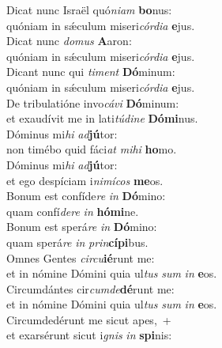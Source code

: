 \evenverse Dicat nunc Israël quó\textit{ni}\textit{am} \textbf{bo}nus:~\*\\
\evenverse quóniam in sǽculum miseri\textit{cór}\textit{di}\textit{a} \textbf{e}jus.\\
\oddverse Dicat nunc \textit{do}\textit{mus} \textbf{A}aron:~\*\\
\oddverse quóniam in sǽculum miseri\textit{cór}\textit{di}\textit{a} \textbf{e}jus.\\
\evenverse Dicant nunc qui \textit{ti}\textit{ment} \textbf{Dó}minum:~\*\\
\evenverse quóniam in sǽculum miseri\textit{cór}\textit{di}\textit{a} \textbf{e}jus.\\
\oddverse De tribulatióne invo\textit{cá}\textit{vi} \textbf{Dó}minum:~\*\\
\oddverse et exaudívit me in lati\textit{tú}\textit{di}\textit{ne} \textbf{Dó}\textbf{mi}nus.\\
\evenverse Dóminus mi\textit{hi} \textit{ad}\textbf{jú}tor:~\*\\
\evenverse non timébo quid fáci\textit{at} \textit{mi}\textit{hi} \textbf{ho}mo.\\
\oddverse Dóminus mi\textit{hi} \textit{ad}\textbf{jú}tor:~\*\\
\oddverse et ego despíciam i\textit{ni}\textit{mí}\textit{cos} \textbf{me}os.\\
\evenverse Bonum est confíde\textit{re} \textit{in} \textbf{Dó}mino:~\*\\
\evenverse quam confí\textit{de}\textit{re} \textit{in} \textbf{hó}\textbf{mi}ne.\\
\oddverse Bonum est sperá\textit{re} \textit{in} \textbf{Dó}mino:~\*\\
\oddverse quam sperá\textit{re} \textit{in} \textit{prin}\textbf{cí}\textbf{pi}bus.\\
\evenverse Omnes Gentes \textit{cir}\textit{cu}\textbf{ié}runt me:~\*\\
\evenverse et in nómine Dómini quia ul\textit{tus} \textit{sum} \textit{in} \textbf{e}os.\\
\oddverse Circumdántes cir\textit{cum}\textit{de}\textbf{dé}runt me:~\*\\
\oddverse et in nómine Dómini quia ul\textit{tus} \textit{sum} \textit{in} \textbf{e}os.\\
\evenverse Circumdedérunt me sicut apes,~+\\
\evenverse  et exarsérunt sicut i\textit{gnis} \textit{in} \textbf{spi}nis:~\*\\
